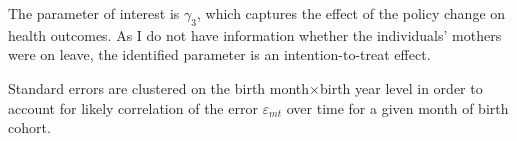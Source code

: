 \documentclass[11pt, a4paper]{article} %
\begin{document}
The parameter of interest is $\gamma_3$, which captures the effect of the policy change on health outcomes. As I do not have information whether the individuals' mothers were on leave, the identified parameter is an intention-to-treat effect. \newline

Standard errors are clustered on the birth month$\times$birth year level in order to account for likely correlation of the error $\varepsilon_{mt}$ over time for a given month of birth cohort.



\bigskip
\end{document}
